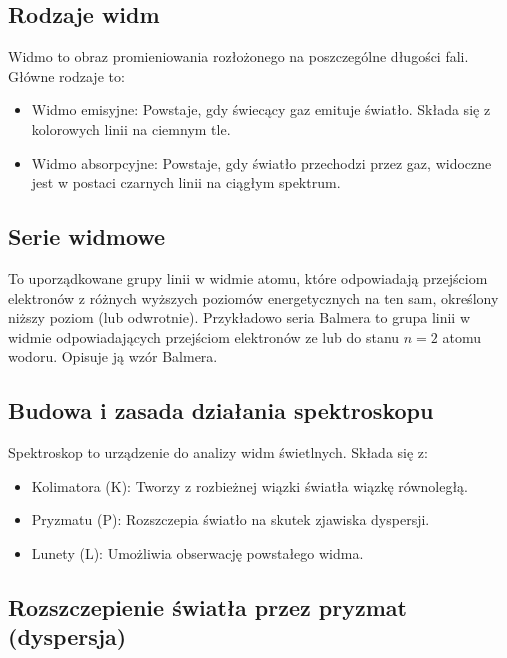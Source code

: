 \documentclass[a4paper,12pt]{article}
\begin{document}
\subsection*{Rodzaje widm}

Widmo to obraz promieniowania rozłożonego na poszczególne długości fali. Główne rodzaje to:

\begin{itemize}
    \item Widmo emisyjne: Powstaje, gdy świecący gaz emituje światło. Składa się z kolorowych linii na ciemnym tle.

    \item Widmo absorpcyjne: Powstaje, gdy światło przechodzi przez gaz, widoczne jest w postaci czarnych linii na ciągłym spektrum.~\cite{fizyka_dla_szkół_wyższych_tom_3}
\end{itemize}


\subsection*{Serie widmowe}

To uporządkowane grupy linii w widmie atomu, które odpowiadają przejściom elektronów z różnych wyższych poziomów energetycznych na ten sam, określony niższy poziom (lub odwrotnie). Przykładowo seria Balmera to grupa linii w widmie odpowiadających przejściom elektronów ze lub do stanu $n=2$ atomu wodoru. Opisuje ją wzór Balmera. ~\cite{fizyka_dla_szkół_wyższych_tom_3}

\subsection*{Budowa i zasada działania spektroskopu}

Spektroskop to urządzenie do analizy widm świetlnych. Składa się z:

\begin{itemize}
    \item Kolimatora (K): Tworzy z rozbieżnej wiązki światła wiązkę równoległą.
    
    \item Pryzmatu (P): Rozszczepia światło na skutek zjawiska dyspersji.
    
    \item Lunety (L): Umożliwia obserwację powstałego widma.
\end{itemize}

\subsection*{Rozszczepienie światła przez pryzmat (dyspersja)}
\end{document}
